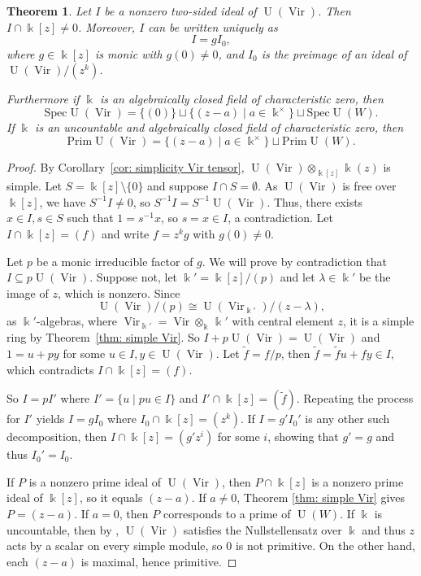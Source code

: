 \documentclass[12pt]{amsart}
\theoremstyle{plain}
\newtheorem{theorem}{Theorem}[section]
\theoremstyle{definition}
\numberwithin{equation}{theorem}
\newcommand{\kk}{\Bbbk}
\newcommand{\Vir}{\operatorname{Vir}}
\newcommand{\UU}{\operatorname{U}}
\newcommand{\Spec}{\mathrm{Spec}}
\newcommand{\Prim}{\mathrm{Prim}}
\begin{document}
\begin{theorem}\label{thm: ideal UVir}
    Let $I$ be a nonzero two-sided ideal of $\UU(\Vir)$. Then $I \cap \kk[z] \neq 0$. Moreover, $I$ can be written uniquely as
    \[I = g I_0,\]
    where $g \in \kk[z]$ is monic with $g(0) \neq 0$, and $I_0$ is the preimage of an ideal of $\UU(\Vir)/(z^k)$.
    
    Furthermore if $\kk$ is an algebraically closed field of characteristic zero, then
    \[ \Spec \UU(\Vir) = \{(0)\} \sqcup \{(z-a) \mid a \in \kk^\times\} \sqcup \Spec \UU(W). \]
    If $\kk$ is an uncountable and algebraically closed field of characteristic zero, then
    \[ \Prim \UU(\Vir) = \{(z-a) \mid a \in \kk^\times\} \sqcup \Prim \UU(W). \]
\end{theorem}
\begin{proof}
    By Corollary~\ref{cor: simplicity Vir tensor}, $\UU(\Vir) \otimes_{\kk[z]} \kk(z)$ is simple. Let $S = \kk[z] \setminus \{0\}$ and suppose $I \cap S = \emptyset$. As $\UU(\Vir)$ is free over $\kk[z]$, we have $S^{-1}I \neq 0$, so $S^{-1}I  = S^{-1}\UU(\Vir)$. Thus, there exists $x \in I, s \in S$ such that $1 = s^{-1}x$, so $s = x \in I$, a contradiction. Let $I \cap \kk[z] = (f)$ and write $f = z^k g$ with $g(0) \neq 0$. 

    Let $p$ be a monic irreducible factor of $g$. We will prove by contradiction that $I \subseteq p\UU(\Vir)$. Suppose not, let $\kk' = \kk[z]/(p)$ and let $\lambda \in \kk'$ be the image of $z$, which is nonzero. Since  
    \[\UU(\Vir)/(p) \cong \UU(\Vir_{\kk'})/(z -\lambda),\]
    as $\kk'$-algebras, where $\Vir_{\kk'} = \Vir \otimes_{\kk} \, \kk'$ with central element $z$, it is a simple ring by Theorem~\ref{thm: simple Vir}. So $I + p \UU(\Vir) = \UU(\Vir)$ and  $1 = u + py$ for some $u \in I, y \in  \UU(\Vir)$. Let $\tilde{f} = f/p$, then $\tilde{f} = \tilde{f}u + fy \in I$, which contradicts $I \cap \kk[z] = (f)$.

    So $I = pI'$ where $I' = \{u \mid pu \in I\}$ and $I' \cap \kk[z] = (\tilde{f})$. Repeating the process for $I'$ yields $I = gI_0$ where $I_0 \cap \kk[z] = (z^k)$. If $I = g'I_0'$ is any other such decomposition, then $I \cap \kk[z] = (g'z^i)$ for some $i$, showing that $g' = g$ and thus $I_0' = I_0$.

    If $P$ is a nonzero prime ideal of $\UU(\Vir)$, then $P  \cap \kk[z]$ is a nonzero prime ideal of $\kk[z]$, so it equals $(z - a)$. If $a \neq 0$, Theorem \ref{thm: simple Vir}  gives $P = (z - a)$. If $a = 0$, then $P$ corresponds to a prime of $\UU(W)$. If $\kk$ is uncountable, then by \cite[9.1.8(1)]{McConnellRobson01}, $\UU(\Vir)$ satisfies the Nullstellensatz over $\kk$ and thus $z$ acts by a scalar on every simple module, so $0$ is not primitive. On the other hand, each $(z - a)$ is maximal, hence primitive.
\end{proof}
\end{document}
